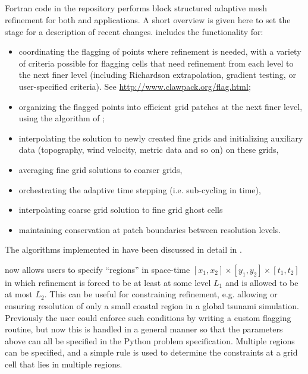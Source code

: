 %
%
%

\subsection{\amrclaw} \label{sec:amrclaw}
Fortran code in the \amrclaw repository performs block structured adaptive mesh
refinement \cite{BO,BC} for both
\clawpack and \geoclaw  applications.
A short overview is given
here to set the stage for a description of recent changes.
\amrclaw includes the functionality for:
\begin{itemize}
\item
coordinating the flagging of points where refinement is needed,
with a variety of criteria possible for flagging cells that need refinement
from each level to the next finer level (including Richardson extrapolation,
gradient testing, or user-specified criteria).  See
\url{http://www.clawpack.org/flag.html};
\item
organizing the flagged points into efficient grid
patches at the next finer level, using the algorithm of
\cite{mjb-rig:cluster};
\item interpolating the solution to newly created fine grids and initializing 
auxiliary data (topography, wind velocity, metric data and so on) on  these 
grids,
\item averaging fine grid solutions to coarser grids,
\item orchestrating the adaptive time stepping (i.e. sub-cycling in time),
\item interpolating coarse grid solution to fine grid ghost cells
\item maintaining conservation at patch boundaries between resolution levels.
\end{itemize}
The algorithms implemented in \amrclaw have been discussed in detail in
\cite{mjb-rjl:amrclaw,LeVequeGeorgeBerger:an11}.

\amrclaw now allows users to specify ``regions'' in space-time
$[x_1,x_2] \times [y_1,y_2] \times [t_1,t_2]$ in which refinement is forced to
be at least at some level $L_1$ and is allowed to be at most $L_2$.  This can be
useful for constraining refinement, e.g. allowing or ensuring resolution of only
a small coastal region in a global tsunami simulation. Previously the user could
enforce such conditions by writing a custom flagging routine, but now this is
handled in a general manner so that the parameters above can all be specified in
the Python problem specification. Multiple regions can be specified, and a
simple rule is used to determine the constraints at a grid cell that lies in
multiple regions.

